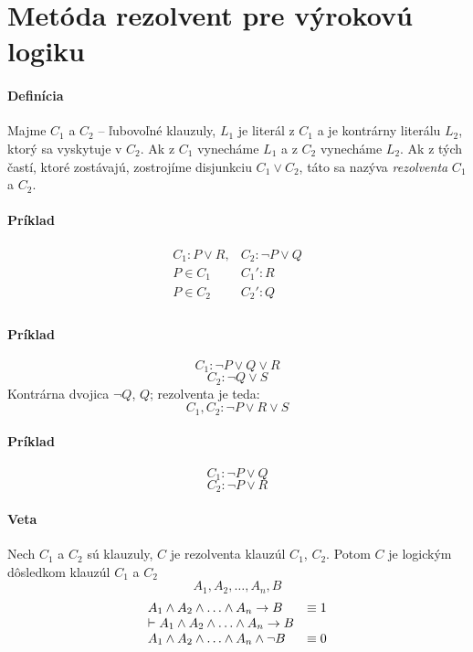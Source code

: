\section{Metóda rezolvent pre výrokovú logiku}
\startFIXME

\paragraph{Definícia} Majme $C_1$ a $C_2$ -- ľubovoľné klauzuly, $L_1$ je
literál z $C_1$ a je kontrárny literálu $L_2$, ktorý sa vyskytuje v $C_2$. Ak z
$C_1$ vynecháme $L_1$ a z $C_2$ vynecháme $L_2$. Ak z tých častí, ktoré
zostávajú, zostrojíme disjunkciu $C_1 \lor C_2$, táto sa nazýva
\emph{rezolventa} $C_1$ a $C_2$.

\paragraph{Príklad}
$$
\begin{array}{ll}
C_1: P \lor R, & C_2: \neg P \lor Q \\
P \in C_1 & C_1': R \\
P \in C_2 & C_2': Q \\
\end{array}
$$

\paragraph{Príklad}
$$C_1: \neg P \lor Q\lor R$$
$$C_2: \neg Q \lor S$$
Kontrárna dvojica $\neg Q$, $Q$; rezolventa je teda:
$$C_1, C_2: \neg P \lor R \lor S$$

\paragraph{Príklad}

$$C_1: \neg P \lor Q$$
$$C_2: \neg P \lor R$$

\paragraph{Veta} Nech $C_1$ a $C_2$ sú klauzuly, $C$ je rezolventa klauzúl
$C_1$, $C_2$. Potom $C$ je logickým dôsledkom klauzúl $C_1$ a $C_2$
$$A_1, A_2, \ldots, A_n, B$$
$$
\begin{array}{ll}
A_1 \land A_2 \land \ldots \land A_n \rightarrow B & \equiv 1	\\
\vdash A_1 \land A_2 \land \ldots \land A_n \rightarrow B & \\
A_1 \land A_2 \land \ldots \land A_n \land \neg B & \equiv 0	\\
\end{array}
$$
